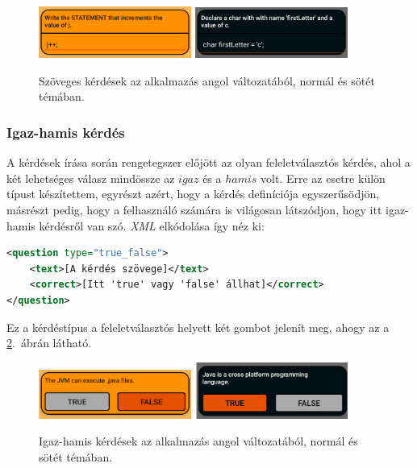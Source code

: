 \documentclass[12pt,a4paper]{article}
\newcommand{\xml}{\textit{XML}\xspace}
\begin{document}
	\begin{figure}[h!]
		\centering
		\includegraphics[width=5cm]{question_text}
		\includegraphics[width=5cm]{question_text_dark}
		\caption{Szöveges kérdések az alkalmazás angol változatából, normál és sötét témában.}
		\label{question_text_figure}
	\end{figure}
	
	\subsubsection{Igaz-hamis kérdés}
	
	A kérdések írása során rengetegszer előjött az olyan feleletválasztós kérdés, ahol a két lehetséges válasz mindössze az $igaz$ és a $hamis$ volt. Erre az esetre külön típust készítettem, egyrészt azért, hogy a kérdés definíciója egyszerűsödjön, másrészt pedig, hogy a felhasználó számára is világosan látszódjon, hogy itt igaz-hamis kérdésről van szó. \xml elkódolása így néz ki:
	
	\begin{lstlisting}[language=XML]	
<question type="true_false">
	<text>[A kérdés szövege]</text>
	<correct>[Itt 'true' vagy 'false' állhat]</correct>
</question>
	\end{lstlisting}
	
	Ez a kérdéstípus a feleletválasztós helyett két gombot jelenít meg, ahogy az a \ref{question_true_false_figure}.\ ábrán látható.
	
	\begin{figure}[h!]
		\centering
		\includegraphics[width=5cm]{question_true_false}
		\includegraphics[width=5cm]{question_true_false_dark}
		\caption{Igaz-hamis kérdések az alkalmazás angol változatából, normál és sötét témában.}
		\label{question_true_false_figure}
	\end{figure}
	
\end{document}

